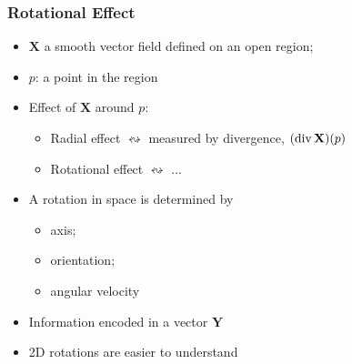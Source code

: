 \begin{frame}
  \frametitle{Rotational Effect}

  \begin{itemize}
    \item $\textbf{X}$ a smooth vector field defined on an open region;
    \item $p$: a point in the region
    \item Effect of $\textbf{X}$ around $p$:
    \begin{itemize}
      \item Radial effect $\leftrightsquigarrow$ measured by divergence,
      $(\operatorname{div} \textbf{X})(p)$
      \item Rotational effect $\leftrightsquigarrow$ ...
    \end{itemize}
    \item \pause A rotation in space is determined by
    \begin{itemize}
      \item axis;
      \item orientation;
      \item angular velocity
    \end{itemize}
    \item \pause Information encoded in a vector $\textbf{Y}$
    \item \pause 2D rotations are easier to understand
  \end{itemize}


\end{frame}

